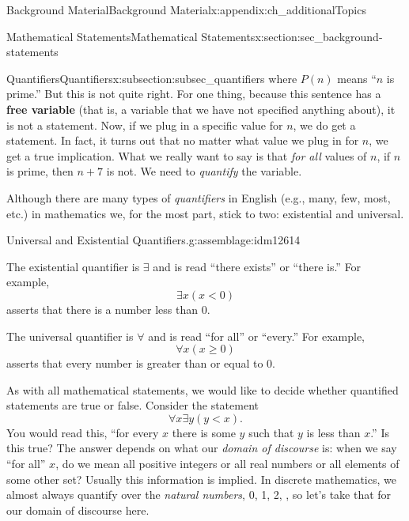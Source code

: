 \documentclass[oneside,10pt,]{book}
\newcommand{\terminology}[1]{\textbf{#1}}
\numberwithin{equation}{chapter}
\newcommand{\lt}{<}
\begin{document}
\begin{appendixptx}{Background Material}{}{Background Material}{}{}{x:appendix:ch_additionalTopics}
\begin{sectionptx}{Mathematical Statements}{}{Mathematical Statements}{}{}{x:section:sec_background-statements}
\begin{subsectionptx}{Quantifiers}{}{Quantifiers}{}{}{x:subsection:subsec_quantifiers}
where \(P(n)\) means ``\(n\) is prime.'' But this is not quite right. For one thing, because this sentence has a \terminology{free variable} (that is, a variable that we have not specified anything about), it is not a statement. Now, if we plug in a specific value for \(n\), we do get a statement. In fact, it turns out that no matter what value we plug in for \(n\), we get a true implication. What we really want to say is that \emph{for all} values of \(n\), if \(n\) is prime, then \(n+7\) is not. We need to \emph{quantify} the variable.%
\par
Although there are many types of \emph{quantifiers} in English (e.g., many, few, most, etc.) in mathematics we, for the most part, stick to two: existential and universal.%
\begin{assemblage}{Universal and Existential Quantifiers.}{g:assemblage:idm12614}%
%
\par
The existential quantifier is \(\exists\) and is read ``there exists'' or ``there is.'' For example, \label{g:notation:idm12628}%
\begin{equation*}
\exists x (x \lt 0)
\end{equation*}
asserts that there is a number less than 0.%
\par
The universal quantifier is \(\forall\) and is read ``for all'' or ``every.'' For example,  \label{g:notation:idm12641}%
\begin{equation*}
\forall x (x \ge 0)
\end{equation*}
asserts that every number is greater than or equal to 0.%
\end{assemblage}
As with all mathematical statements, we would like to decide whether quantified statements are true or false. Consider the statement%
\begin{equation*}
\forall x \exists y (y \lt x).
\end{equation*}
You would read this, ``for every \(x\) there is some \(y\) such that \(y\) is less than \(x\).'' Is this true? The answer depends on what our \emph{domain of discourse} is: when we say ``for all'' \(x\), do we mean all positive integers or all real numbers or all elements of some other set? Usually this information is implied. In discrete mathematics, we almost always quantify over the \emph{natural numbers}, 0, 1, 2, \textellipsis{}, so let's take that for our domain of discourse here.%
\par

\end{subsectionptx}
\end{sectionptx}
\end{appendixptx}
\end{document}
